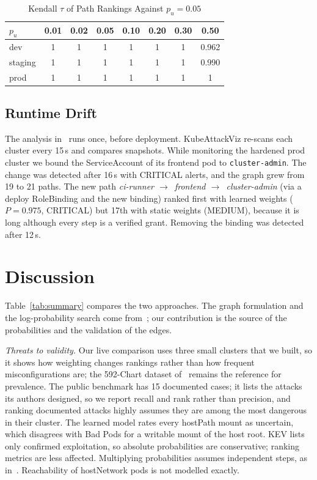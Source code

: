 \documentclass[conference]{IEEEtran}
\newcommand{\ra}{$\rightarrow$}
\begin{document}
\begin{table}[t]
\caption{Kendall $\tau$ of Path Rankings Against $p_u=0.05$}
\label{tab:sens}
\centering
\footnotesize
\begin{tabular}{@{}lccccccc@{}}
\toprule
$p_u$ & 0.01 & 0.02 & 0.05 & 0.10 & 0.20 & 0.30 & 0.50 \\
\midrule
dev & 1 & 1 & 1 & 1 & 1 & 1 & 0.962 \\
staging & 1 & 1 & 1 & 1 & 1 & 1 & 0.990 \\
prod & 1 & 1 & 1 & 1 & 1 & 1 & 1 \\
\bottomrule
\end{tabular}
\end{table}

\subsection{Runtime Drift}
The analysis in~\cite{blaise2022} runs once, before deployment. KubeAttackViz re-scans each cluster every 15\,s and compares
snapshots. While monitoring the hardened prod cluster we bound the ServiceAccount of its frontend pod to \texttt{cluster-admin}.
The change was detected after 16\,s with CRITICAL alerts, and the graph grew from 19 to 21 paths. The new path \emph{ci-runner
\ra\ frontend \ra\ cluster-admin} (via a deploy RoleBinding and the new binding) ranked first with learned weights ($P=0.975$,
CRITICAL) but 17th with static weights (MEDIUM), because it is long although every step is a verified grant. Removing the
binding was detected after 12\,s.

\section{Discussion}
Table~\ref{tab:summary} compares the two approaches. The graph formulation and the log-probability search come
from~\cite{blaise2022}; our contribution is the source of the probabilities and the validation of the edges.

\emph{Threats to validity.} Our live comparison uses three small clusters that we built, so it shows how weighting changes
rankings rather than how frequent misconfigurations are; the 592-Chart dataset of~\cite{blaise2022} remains the reference for
prevalence. The public benchmark has 15 documented cases; it lists the attacks its authors designed, so we report recall and
rank rather than precision, and ranking documented attacks highly assumes they are among the most dangerous in their cluster.
The learned model rates every hostPath mount as uncertain, which disagrees with Bad Pods for a writable mount of the host root.
KEV lists only confirmed exploitation, so absolute probabilities are conservative; ranking metrics are less
affected. Multiplying probabilities assumes independent steps, as in~\cite{blaise2022}. Reachability of hostNetwork pods is not
modelled exactly.
\end{document}
